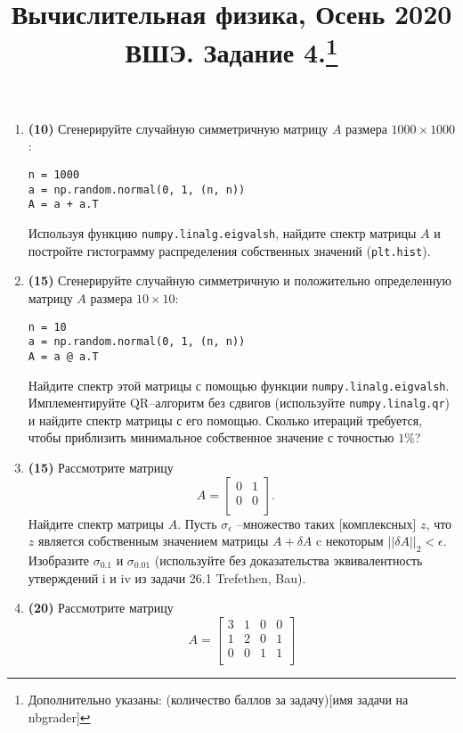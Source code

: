 \documentclass[prb,papersize=a4paper,notitlepage]{revtex4-1}%
\begin{document}
\title{Вычислительная физика, Осень 2020 ВШЭ. Задание 4.\footnote{Дополнительно указаны: (количество баллов за задачу)[имя задачи на nbgrader]}}
\maketitle
\begin{enumerate}
\item \textbf{(10)} Сгенерируйте случайную симметричную матрицу $A$ размера $1000 \times 1000$:
\lstset{language=Python}
\lstset{frame=lines}
\lstset{basicstyle=\ttfamily}
\begin{lstlisting}
n = 1000
a = np.random.normal(0, 1, (n, n))
A = a + a.T
\end{lstlisting}
Используя функцию \lstinline{numpy.linalg.eigvalsh}, найдите спектр матрицы $A$ и постройте гистограмму распределения собственных значений (\lstinline{plt.hist}).
\item \textbf{(15)} Сгенерируйте случайную симметричную и положительно определенную матрицу $A$ размера $10 \times 10$:
\lstset{language=Python}
\lstset{frame=lines}
\lstset{basicstyle=\ttfamily}
\begin{lstlisting}
n = 10
a = np.random.normal(0, 1, (n, n))
A = a @ a.T
\end{lstlisting}
Найдите спектр этой матрицы с помощью функции \lstinline{numpy.linalg.eigvalsh}. Имплементируйте $\textrm{QR}$--алгоритм без сдвигов (используйте \lstinline{numpy.linalg.qr}) и найдите спектр матрицы с его помощью. Сколько итераций требуется, чтобы приблизить минимальное собственное значение с точностью $1\%$?
\item \textbf{(15)} Рассмотрите матрицу 
$$
A=\begin{bmatrix}
0 & 1\\
0 & 0\\
\end{bmatrix}.\quad
$$
Найдите спектр матрицы $A$. Пусть $\sigma_\epsilon$ --множество таких [комплексных] $z$, что $z$ является собственным значением матрицы $A+\delta A$ c некоторым $||\delta A||_2<\epsilon$. Изобразите $\sigma_{0.1}$ и $\sigma_{0.01}$ (используйте без доказательства эквивалентность утверждений i и iv из задачи 26.1 Trefethen, Bau).
\item \textbf{(20)} Рассмотрите матрицу 
$$
A=\begin{bmatrix}
3 & 1 & 0 & 0\\
1 & 2 & 0 & 1\\
0 & 0 & 1 & 1\\

\end{bmatrix}$$
\end{enumerate}
\end{document}
